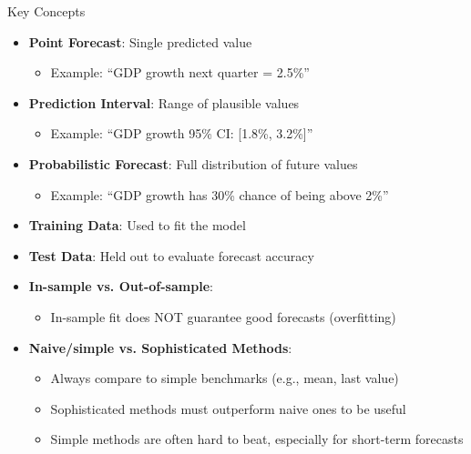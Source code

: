 \documentclass[11pt]{beamer}
\begin{document}
\begin{frame}[fragile]{Key Concepts}
	\begin{itemize}
		\item \textbf{Point Forecast}: Single predicted value
		      \begin{itemize}
			      \item Example: ``GDP growth next quarter = 2.5\%''
		      \end{itemize}

		\item \textbf{Prediction Interval}: Range of plausible values
		      \begin{itemize}
			      \item Example: ``GDP growth 95\% CI: [1.8\%, 3.2\%]''
		      \end{itemize}
		\item \textbf{Probabilistic Forecast}: Full distribution of future values
		      \begin{itemize}
			      \item Example: ``GDP growth has 30\% chance of being above 2\%''
		      \end{itemize}

		\item \textbf{Training Data}: Used to fit the model

		\item \textbf{Test Data}: Held out to evaluate forecast accuracy

		\item \textbf{In-sample vs. Out-of-sample}:
		      \begin{itemize}
			      \item In-sample fit does NOT guarantee good forecasts (overfitting)
		      \end{itemize}

		\item \textbf{Naive/simple vs. Sophisticated Methods}:
		      \begin{itemize}
			      \item Always compare to simple benchmarks (e.g., mean, last value)
			      \item Sophisticated methods must outperform naive ones to be useful
			      \item Simple methods are often hard to beat, especially for short-term forecasts
		      \end{itemize}
	\end{itemize}
\end{frame}
\end{document}
